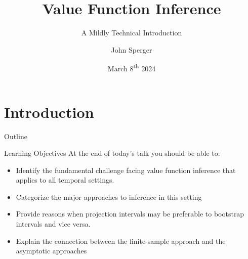 \documentclass[aspectratio=169, professionalfonts]{beamer}
\author{John Sperger}
\date{March 8\textsuperscript{th} 2024}
\title{Value Function Inference}
\subtitle{A Mildly Technical Introduction}
\begin{document}
\maketitle

\section{Introduction}
\begin{frame}{Outline}
	\tableofcontents[hideallsubsections]
\end{frame}
\begin{frame}[label={overview:objectives}]{Learning Objectives}
	\vfill \pause
	At the end of today's talk you should be able to:
	\begin{itemize}
		\item Identify the fundamental challenge facing value function
		      inference		      that applies to all temporal settings.
		      \vfill \pause


		\item Categorize the major approaches to inference in this setting

		      \vfill \pause

		\item Provide reasons when projection intervals may be preferable to
		      bootstrap intervals and vice versa.
		      \vfill \pause

		\item Explain the connection between the finite-sample approach and the
		      asymptotic approaches
	\end{itemize}
	\vfill
\end{frame}

\end{document}
